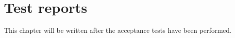 \chapter{Test reports}
\label{chap:testReports}
This chapter will be written after the acceptance tests have been performed.




